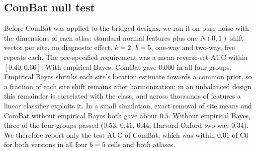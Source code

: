 \begin{table}[h]
\centering
\caption{Robustness variants of ABIDE-I. Q1: cost of purity M $-$ P at $k=1$ and $k=6$, and reverse-set AUC of P at $k=1$ and $k=6$. Q2: $E_{\mathrm{subj}}-$ truth at $k=2$, and mean absolute error of $E_{\mathrm{subj}}$ and LSPO at $k=2$. Q3: C0 $-$ S0 in test and reverse-set AUC, two-way $b=5$, $k=2$, with the number of feasible repeats.}
\label{tab:robust}
\small
{}
\end{table}

\subsection{ComBat null test}

Before ComBat was applied to the bridged designs, we ran it on pure noise with the dimensions of each atlas: standard normal features plus one $N(0,1)$ shift vector per site, no diagnostic effect, $k=2$, $b=5$, one-way and two-way, five repeats each. The pre-specified requirement was a mean reverse-set AUC within $[0.40,0.60]$. With empirical Bayes, ComBat gave $0.000$ in all four groups. Empirical Bayes shrinks each site's location estimate towards a common prior, so a fraction of each site shift remains after harmonization; in an unbalanced design this remainder is correlated with the class, and across thousands of features a linear classifier exploits it. In a small simulation, exact removal of site means and ComBat without empirical Bayes both gave about $0.5$. Without empirical Bayes, three of the four groups passed ($0.53$, $0.41$, $0.44$; Harvard-Oxford two-way $0.34$). We therefore report only the test AUC of ComBat, which was within $0.01$ of C0 for both versions in all four $b=5$ cells and both atlases.

